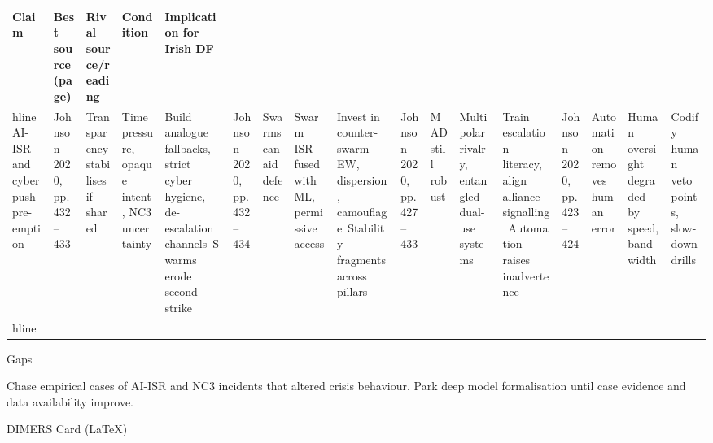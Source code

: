 \usepackage{array}
\begin{tabular}{p{3.2cm}p{4.2cm}p{3.6cm}p{3.2cm}p{4.2cm}}
	\textbf{Claim} & \textbf{Best source (page)} & \textbf{Rival source/reading} & \textbf{Condition} & \textbf{Implication for Irish DF}\\hline
	AI-ISR and cyber push pre-emption & Johnson 2020, pp.432–433 & Transparency stabilises if shared & Time pressure, opaque intent, NC3 uncertainty & Build analogue fallbacks, strict cyber hygiene, de-escalation channels\
	Swarms erode second-strike & Johnson 2020, pp.432–434 & Swarms can aid defence & Swarm ISR fused with ML, permissive access & Invest in counter-swarm EW, dispersion, camouflage\
	Stability fragments across pillars & Johnson 2020, pp.427–433 & MAD still robust & Multipolar rivalry, entangled dual-use systems & Train escalation literacy, align alliance signalling\
	Automation raises inadvertence & Johnson 2020, pp.423–424 & Automation removes human error & Human oversight degraded by speed, bandwidth & Codify human veto points, slow-down drills\\hline
\end{tabular}

Gaps

Chase empirical cases of AI-ISR and NC3 incidents that altered crisis behaviour.
Park deep model formalisation until case evidence and data availability improve.

\parencite{JOHNSON_2020}


DIMERS Card (LaTeX)

